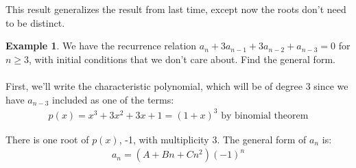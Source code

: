 \documentclass[]{article}
\theoremstyle{definition}
\newtheorem{ex}{Example}[section]
\begin{document}
		This result generalizes the result from last time, except now the roots don't need to be distinct.

		\begin{ex}
			We have the recurrence relation $a_n + 3a_{n - 1} + 3a_{n - 2} + a_{n - 3} = 0$ for $n \ge 3$, with initial conditions that we don't care about. Find the general form.
			\\ \\
			First, we'll write the characteristic polynomial, which will be of degree 3 since we have $a_{n - 3}$ included as one of the terms:
			\begin{align*}
				p(x) = x^3 + 3x^2 + 3x + 1 = (1 + x)^3 \text{ by binomial theorem}
			\end{align*}

			There is one root of $p(x)$, -1, with multiplicity 3. The general form of $a_n$ is:
			\begin{align*}
				a_n = (A + Bn + Cn^2)(-1)^n
			\end{align*}
		\end{ex}
\end{document}

